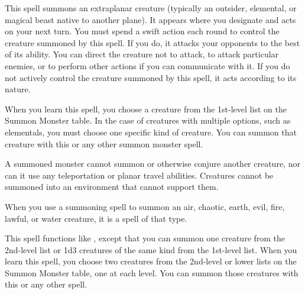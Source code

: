 \spellrng{\rngclose}
\begin{spelleffect}
  This spell summons an extraplanar creature (typically an outsider, elemental, or magical beast native to another plane). It appears where you designate and acts on your next turn. You must spend a swift action each round to control the creature summoned by this spell. If you do, it attacks your opponents to the best of its ability. You can direct the creature not to attack, to attack particular enemies, or to perform other actions if you can communicate with it. If you do not actively control the creature summoned by this spell, it acts according to its nature.
  \par When you learn this spell, you choose a creature from the 1st-level list on the Summon Monster table. In the case of creatures with multiple options, such as elementals, you must choose one specific kind of creature. You can summon that creature with this or any other summon monster spell.
  \par A summoned monster cannot summon or otherwise conjure another creature, nor can it use any teleportation or planar travel abilities. Creatures cannot be summoned into an environment that cannot support them.
  \par When you use a summoning spell to summon an air, chaotic, earth, evil, fire, lawful, or water creature, it is a spell of that type.
\end{spelleffect}

\begin{spelleffect}
  This spell functions like , except that you can summon one creature from the 2nd-level list or 1d3 creatures of the same kind from the 1st-level list. When you learn this spell, you choose two creatures from the 2nd-level or lower lists on the Summon Monster table, one at each level. You can summon those creatures with this or any other  spell.
\end{spelleffect}


